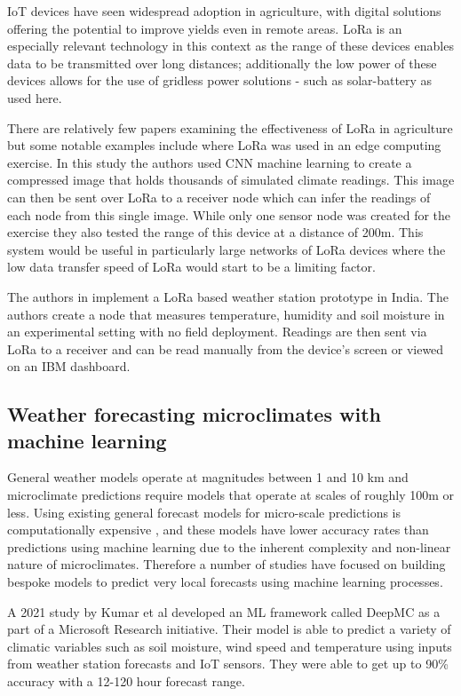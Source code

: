 \documentclass[conference]{IEEEtran}
\begin{document}
IoT devices have seen widespread adoption in agriculture, with digital solutions
offering the potential to improve yields even in remote areas. LoRa is an
especially relevant technology in this context as the range of these devices
enables data to be transmitted over long distances; additionally the low power
of these devices allows for the use of gridless power solutions - such as
solar-battery as used here. 

There are relatively few papers examining the effectiveness of LoRa in
agriculture but some notable examples include \cite{edgeAiGiaEtAl} where LoRa
was used in an edge computing exercise. In this study the authors used CNN
machine learning to create a compressed image that holds thousands of simulated
climate readings. This image can then be sent over LoRa to a receiver node which
can infer the readings of each node from this single image. While only one
sensor node was created for the exercise they also tested the range of this
device at a distance of 200m. This system would be useful in particularly large
networks of LoRa devices where the low data transfer speed of LoRa would start
to be a limiting factor.

The authors in \cite{smartFarmKodaliEtAl} implement a LoRa based weather station
prototype in India. The authors create a node that measures temperature,
humidity and soil moisture in an experimental setting with no field deployment.
Readings are then sent via LoRa to a receiver and can be read manually from the
device's screen or viewed on an IBM dashboard.  

\subsection{Weather forecasting microclimates with machine learning}

General weather models operate at magnitudes between 1 and 10 km and
microclimate predictions require models that operate at scales of roughly 100m
or less. Using existing general forecast models for micro-scale predictions is
computationally expensive \cite{blunn2024machine}, and these models have lower
accuracy rates than predictions using machine learning due to the inherent
complexity and non-linear nature of microclimates. Therefore a number of studies
have focused on building bespoke models to predict very local forecasts using
machine learning processes.

A 2021 study by Kumar et al \cite{kumar2021} developed an ML framework called
DeepMC as a part of a Microsoft Research initiative. Their model is able to
predict a variety of climatic variables such as soil moisture, wind speed and
temperature using inputs from weather station forecasts and IoT sensors. They
were able to get up to 90\% accuracy with a 12-120 hour forecast range.
\end{document}
